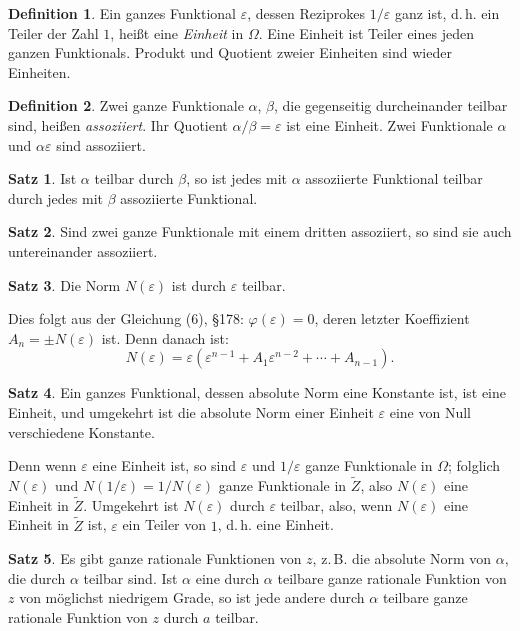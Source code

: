 \documentclass[12pt,a4paper]{article}
\theoremstyle{definition}
\newtheorem{defin}{Definition}[section]
\newtheorem{satz}{Satz}[section]
\begin{document}
\begin{defin}
Ein ganzes Funktional $\varepsilon$, dessen Reziprokes $1/\varepsilon$ ganz ist, d.\,h. ein Teiler der Zahl $1$, heißt eine \emph{Einheit} in $\Omega$. Eine Einheit ist Teiler eines jeden ganzen Funktionals. Produkt und Quotient zweier Einheiten sind wieder Einheiten.
\end{defin}

\begin{defin}
Zwei ganze Funktionale $\alpha$, $\beta$, die gegenseitig durcheinander teilbar sind, heißen \emph{assoziiert}. Ihr Quotient $\alpha/\beta = \varepsilon$ ist eine Einheit. Zwei Funktionale $\alpha$ und $\alpha\varepsilon$ sind assoziiert.
\end{defin}

\begin{satz}
Ist $\alpha$ teilbar durch $\beta$, so ist jedes mit $\alpha$ assoziierte Funktional teilbar durch jedes mit $\beta$ assoziierte Funktional.
\end{satz}

\begin{satz}
Sind zwei ganze Funktionale mit einem dritten assoziiert, so sind sie auch untereinander assoziiert.
\end{satz}

\begin{satz}
Die Norm $N(\varepsilon)$ ist durch $\varepsilon$ teilbar.
\end{satz}
Dies folgt aus der Gleichung (6), \S 178: $\varphi(\varepsilon) = 0$, deren letzter Koeffizient $A_n = \pm N(\varepsilon)$ ist. Denn danach ist:
\[N(\varepsilon) = \varepsilon(\varepsilon^{n-1} + A_1\varepsilon^{n-2} + \cdots + A_{n-1}).\]

\begin{satz}
Ein ganzes Funktional, dessen absolute Norm eine Konstante ist, ist eine Einheit, und umgekehrt ist die absolute Norm einer Einheit $\varepsilon$ eine von Null verschiedene Konstante.
\end{satz}
Denn wenn $\varepsilon$ eine Einheit ist, so sind $\varepsilon$ und $1/\varepsilon$ ganze Funktionale in $\Omega$; folglich $N(\varepsilon)$ und $N(1/\varepsilon) = 1/N(\varepsilon)$ ganze Funktionale in $\tilde{Z}$, also $N(\varepsilon)$ eine Einheit in $\tilde{Z}$. Umgekehrt ist $N(\varepsilon)$ durch $\varepsilon$ teilbar, also, wenn $N(\varepsilon)$ eine Einheit in $\tilde{Z}$ ist, $\varepsilon$ ein Teiler von $1$, d.\,h. eine Einheit.

\begin{satz}
Es gibt ganze rationale Funktionen von $z$, z.\,B. die absolute Norm von $\alpha$, die durch $\alpha$ teilbar sind. Ist $\alpha$ eine durch $\alpha$ teilbare ganze rationale Funktion von $z$ von möglichst niedrigem Grade, so ist jede andere durch $\alpha$ teilbare ganze rationale Funktion von $z$ durch $a$ teilbar.
\end{satz}
\end{document}
